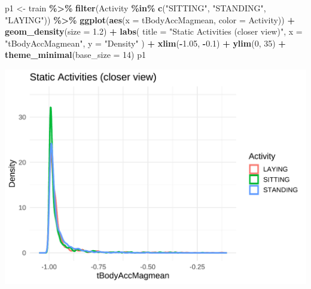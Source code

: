 \documentclass[
]{article}
\newenvironment{Shaded}{\begin{snugshade}}{\end{snugshade}}
\newcommand{\AttributeTok}[1]{\textcolor[rgb]{0.13,0.29,0.53}{#1}}
\newcommand{\DecValTok}[1]{\textcolor[rgb]{0.00,0.00,0.81}{#1}}
\newcommand{\FloatTok}[1]{\textcolor[rgb]{0.00,0.00,0.81}{#1}}
\newcommand{\FunctionTok}[1]{\textcolor[rgb]{0.13,0.29,0.53}{\textbf{#1}}}
\newcommand{\NormalTok}[1]{#1}
\newcommand{\OtherTok}[1]{\textcolor[rgb]{0.56,0.35,0.01}{#1}}
\newcommand{\SpecialCharTok}[1]{\textcolor[rgb]{0.81,0.36,0.00}{\textbf{#1}}}
\newcommand{\StringTok}[1]{\textcolor[rgb]{0.31,0.60,0.02}{#1}}
\begin{document}
\begin{Shaded}
\begin{Highlighting}[]
\NormalTok{p1 }\OtherTok{\textless{}{-}}\NormalTok{ train }\SpecialCharTok{\%\textgreater{}\%}
  \FunctionTok{filter}\NormalTok{(Activity }\SpecialCharTok{\%in\%} \FunctionTok{c}\NormalTok{(}\StringTok{"SITTING"}\NormalTok{, }\StringTok{"STANDING"}\NormalTok{, }\StringTok{"LAYING"}\NormalTok{)) }\SpecialCharTok{\%\textgreater{}\%}
  \FunctionTok{ggplot}\NormalTok{(}\FunctionTok{aes}\NormalTok{(}\AttributeTok{x =}\NormalTok{ tBodyAccMagmean, }\AttributeTok{color =}\NormalTok{ Activity)) }\SpecialCharTok{+}
  \FunctionTok{geom\_density}\NormalTok{(}\AttributeTok{size =} \FloatTok{1.2}\NormalTok{) }\SpecialCharTok{+}
  \FunctionTok{labs}\NormalTok{(}
    \AttributeTok{title =} \StringTok{"Static Activities (closer view)"}\NormalTok{,}
    \AttributeTok{x =} \StringTok{"tBodyAccMagmean"}\NormalTok{,}
    \AttributeTok{y =} \StringTok{"Density"}
\NormalTok{  ) }\SpecialCharTok{+}
  \FunctionTok{xlim}\NormalTok{(}\SpecialCharTok{{-}}\FloatTok{1.05}\NormalTok{, }\SpecialCharTok{{-}}\FloatTok{0.1}\NormalTok{) }\SpecialCharTok{+}
  \FunctionTok{ylim}\NormalTok{(}\DecValTok{0}\NormalTok{, }\DecValTok{35}\NormalTok{) }\SpecialCharTok{+}
  \FunctionTok{theme\_minimal}\NormalTok{(}\AttributeTok{base\_size =} \DecValTok{14}\NormalTok{)}
\NormalTok{p1}
\end{Highlighting}
\end{Shaded}

\includegraphics{report_files/figure-latex/unnamed-chunk-14-1.pdf}
\end{document}
